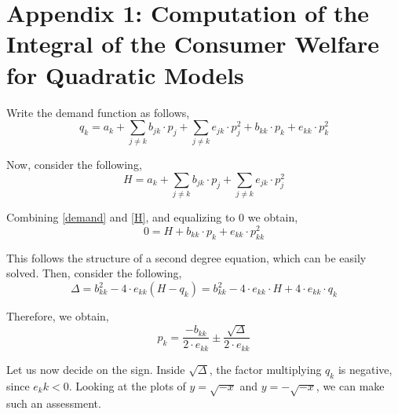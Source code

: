 \documentclass[12pt]{article}
\begin{document}
\newpage
\listoffigures

\newpage
\listoftables

\newpage
\section{Appendix 1: Computation of the Integral of the Consumer Welfare for Quadratic Models}

Write the demand function as follows,
\begin{equation} \label{demand}
q_k = a_k + \sum_{j \neq k} b_{jk} \cdot p_j + \sum_{j \neq k} e_{jk} \cdot p_j^2 + b_{kk} \cdot p_k + e_{kk} \cdot p_k^2
\end{equation}

Now, consider the following,
\begin{equation} \label{H}
H = a_k + \sum_{j \neq k} b_{jk} \cdot p_j + \sum_{j \neq k} e_{jk} \cdot p_j^2
\end{equation}

Combining \ref{demand} and \ref{H}, and equalizing to $0$ we obtain,
\begin{equation*}
0 = H + b_{kk} \cdot p_k + e_{kk} \cdot p_{kk}^2
\end{equation*}

This follows the structure of a second degree equation, which can be easily solved. Then, consider the following,
\begin{equation*}
\Delta = b_{kk}^2 - 4 \cdot e_{kk} (H - q_k) = b_{kk}^2 - 4 \cdot e_{kk} \cdot H + 4 \cdot e_{kk} \cdot q_k 
\end{equation*}

Therefore, we obtain,
\begin{equation*}
p_k = \frac{-b_{kk}}{2 \cdot e_{kk}} \pm \frac{\sqrt{\Delta}}{2 \cdot e_{kk}}
\end{equation*}

Let us now decide on the sign. Inside $\sqrt{\Delta}$, the factor multiplying $q_k$ is negative, since $e_kk < 0$. Looking at the plots of $y = \sqrt{-x}$ and $y = -\sqrt{-x}$, we can make such an assessment.\\
\end{document}
